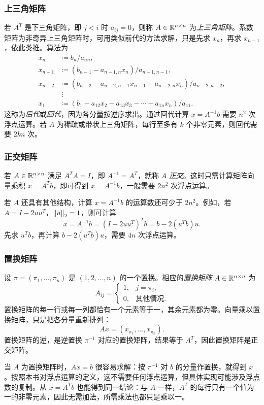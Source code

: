 \subsubsection*{上三角矩阵}
若 $A^T$ 是下三角矩阵，即 $j<i$ 时 $a_{ij}=0$，则称 $A\in\mathbb R^{n\times n}$ 为\emph{上三角矩阵}。系数矩阵为非奇异上三角矩阵时，可用类似前代的方法求解，只是先求 $x_n$，再求 $x_{n-1}$，依此类推。算法为
\begin{align*}
 x_n&\coloneqq b_n/a_{nn},\\
 x_{n-1}&\coloneqq(b_{n-1}-a_{n-1,n}x_n)/a_{n-1,n-1},\\
 x_{n-2}&\coloneqq(b_{n-2}-a_{n-2,n-1}x_{n-1}-a_{n-2,n}x_n)/a_{n-2,n-2},\\
 &\ \vdots\\
 x_1&\coloneqq(b_1-a_{12}x_2-a_{13}x_3-\cdots-a_{1n}x_n)/a_{11}.
\end{align*}
这称为\emph{后代}或\emph{回代}，因为各分量按逆序求出。通过回代计算 $x=A^{-1}b$ 需要 $n^2$ 次浮点运算。若 $A$ 为稀疏或带状上三角矩阵，每行至多有 $k$ 个非零元素，则回代需要 $2kn$ 次。

\subsubsection*{正交矩阵}
若 $A\in\mathbb R^{n\times n}$ 满足 $A^TA=I$，即 $A^{-1}=A^T$，就称 $A$ \emph{正交}。这时只需计算矩阵向量乘积 $x=A^Tb$，即可得到 $x=A^{-1}b$，一般需要 $2n^2$ 次浮点运算。

若 $A$ 还具有其他结构，计算 $x=A^{-1}b$ 的运算数还可少于 $2n^2$。例如，若 $A=I-2uu^T$，$\left\lVert u\right\rVert_2=1$，则可计算
\[
 x=A^{-1}b=(I-2uu^T)^Tb=b-2(u^Tb)u.
\]
先求 $u^Tb$，再计算 $b-2(u^Tb)u$，需要 $4n$ 次浮点运算。

\subsubsection*{置换矩阵}
设 $\pi=(\pi_1,\ldots,\pi_n)$ 是 $(1,2,\ldots,n)$ 的一个置换。相应的\emph{置换矩阵} $A\in\mathbb R^{n\times n}$ 为
\[
 A_{ij}=\begin{cases}1,&j=\pi_i,\\0,&\text{其他情况}.\end{cases}
\]
置换矩阵的每一行或每一列都恰有一个元素等于一，其余元素都为零。向量乘以置换矩阵，只是把各分量重新排列：
\[
 Ax=(x_{\pi_1},\ldots,x_{\pi_n}).
\]
置换矩阵的逆，是逆置换 $\pi^{-1}$ 对应的置换矩阵，结果等于 $A^T$，因此置换矩阵是正交矩阵。

当 $A$ 为置换矩阵时，$Ax=b$ 很容易求解：按 $\pi^{-1}$ 对 $b$ 的分量作置换，就得到 $x$。按照本书对浮点运算的定义，这不需要任何浮点运算，但具体实现可能涉及浮点数的复制。从 $x=A^Tb$ 也能得到同一结论：与 $A$ 一样，$A^T$ 的每行只有一个值为一的非零元素，因此无需加法，所需乘法也都只是乘以一。

